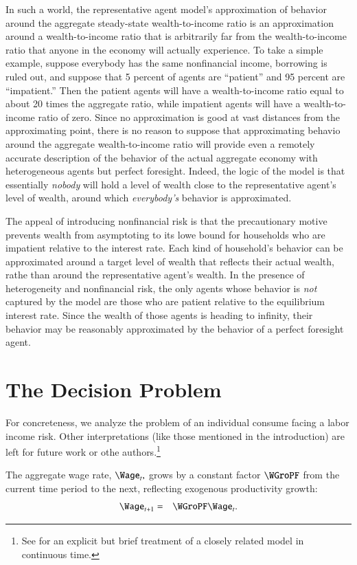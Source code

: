 \documentclass[titlepage,abstract]{\econtex}\newcommand{\texname}{ctDiscrete}
\begin{document}
  In such a world, the representative agent model's approximation of
  behavior around the aggregate steady-state wealth-to-income ratio is
  an approximation around a wealth-to-income ratio that is arbitrarily
  far from the wealth-to-income ratio that anyone in the economy will
  actually experience.  To take a simple example, suppose everybody
  has the same nonfinancial income, borrowing is ruled out, and
  suppose that 5 percent of agents are ``patient'' and 95 percent are
  ``impatient.''  Then the patient agents will have a wealth-to-income
  ratio equal to about 20 times the aggregate ratio, while impatient
  agents will have a wealth-to-income ratio of zero.  Since no
  approximation is good at vast distances from the approximating
  point, there is no reason to suppose that approximating behavio
  around the aggregate wealth-to-income ratio will provide even a
  remotely accurate description of the behavior of the actual
  aggregate economy with heterogeneous agents but perfect foresight.
  Indeed, the logic of the model is that essentially {\it nobody} will
  hold a level of wealth close to the representative agent's level of
  wealth, around which {\it everybody's} behavior is approximated.

  The appeal of introducing nonfinancial risk is that the
  precautionary motive prevents wealth from asymptoting to its lowe
  bound for households who are impatient relative to the interest
  rate.  Each kind of household's behavior can be approximated around
  a target level of wealth that reflects their actual wealth, rathe
  than around the representative agent's wealth.  In the presence of 
heterogeneity and nonfinancial risk, the only agents whose behavior is
{\it not} captured by the model are those who are patient relative to the equilibrium interest rate.  Since the wealth of those agents is heading to infinity, 
their behavior may be reasonably approximated by the behavior of a perfect foresight
agent.


\section{The Decision Problem}
For concreteness, we analyze the problem of an individual consume
facing a labor income risk.  Other interpretations (like those
mentioned in the introduction) are left for future work or othe
authors.\footnote{See \cite{toche:urisk} for an explicit but brief treatment 
  of a closely related model in continuous time.}

The aggregate wage rate, $\Wage_{t},$ grows by a constant factor $\WGroPF$ from the current time period to the next, reflecting exogenous productivity growth:
\begin{eqnarray}
        \Wage_{t+1} & = & \WGroPF \Wage_{t}.
\end{eqnarray}
\end{document}
